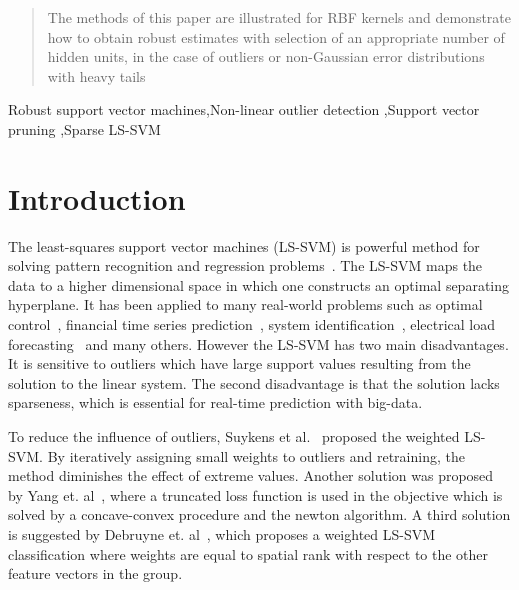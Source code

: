 \documentclass[preprint,12pt]{elsarticle}
\begin{document}
\begin{frontmatter}
\begin{abstract}
The methods of this paper are illustrated for RBF kernels and demonstrate how to obtain
robust estimates with selection of an appropriate number of hidden units, in the case of
outliers or non-Gaussian error distributions with heavy tails

\end{abstract}

\begin{keyword}
	Robust support vector machines\sep Non-linear outlier detection \sep Support vector pruning \sep Sparse LS-SVM 
\end{keyword}
\end{frontmatter}


\section{Introduction}

The least-squares support vector machines (LS-SVM) is powerful method for solving pattern recognition and regression problems~\cite{suykens2002least}. The LS-SVM maps the data to a higher dimensional space in which one constructs an optimal separating hyperplane. It has been applied to many real-world problems such as optimal control~\cite{suykens2001optimal}, financial time series prediction~\cite{van2001financial}, system identification~\cite{goethals2005identification}, electrical load forecasting~\cite{espinoza2006fixed} and many others. However the LS-SVM has two main disadvantages. It is sensitive to outliers which have large support values resulting from the solution to the linear system. The second disadvantage is that the solution lacks sparseness, which is essential for real-time prediction with big-data.

To reduce the influence of outliers, Suykens et al.~\cite{suykens2002weighted} proposed the weighted LS-SVM. By iteratively assigning small weights to outliers and retraining, the method diminishes the effect of extreme values. Another solution was proposed by Yang et. al~\cite{yang2014robust}, where a truncated loss function is used in the objective which is solved by a concave-convex procedure and the newton algorithm. A third solution is suggested by Debruyne et. al~\cite{debruyne2009robustified}, which proposes a weighted LS-SVM classification where weights are equal to spatial rank with respect to the other feature vectors in the group.
\end{document}
